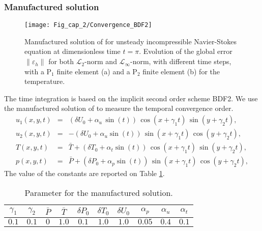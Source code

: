 \subsubsection{Manufactured solution} \label{subsub-conv-nourg}
\begin{figure}
	\begin{center}
		\texttt{[image: Fig\_cap\_2/Convergence\_BDF2]} 
	\end{center}
	\caption{Manufactured solution of \cite{nourgaliev2016fully} for unsteady incompressible Navier-Stokes equation at dimensionless time $t = \pi$. Evolution of the global error $\| \varepsilon_h \|$ for both $\mathcal{L}_2$-norm and $\mathcal{L}_\infty$-norm, with different time steps, with a P$_1$ finite element (a) and a P$_2$ finite element (b) for the temperature.}
	\label{fig-conv-bdf2}
\end{figure}

The time integration is based on the implicit second order scheme BDF2.
We use the manufactured solution of \cite{nourgaliev2016fully} to measure the temporal convergence order.
\begin{eqnarray}
	u_1(x,y,t) &=& \left( \delta U_0 + \alpha_u \, \sin(t) \right) \, \cos(x+ \gamma_1 t) \, \sin(y+ \gamma_2 t), \\ \nonumber
	u_2(x,y,t) &=& - \left( \delta U_0 + \alpha_u \sin(t) \right) \, \sin(x+ \gamma_1 t) \, \cos(y+ \gamma_2 t), \\ \nonumber
	T(x,y,t) &=& \bar{T} + \left( \delta T_0 + \alpha_t \sin(t) \right) \, \cos(x+ \gamma_1 t) \, \sin(y+ \gamma_2 t), \\ \nonumber
	p(x,y,t) &=& \bar{P} + \left(\delta P_0 + \alpha_p \sin(t) \right) \, \sin(x+ \gamma_1 t) \, \cos(y+ \gamma_2 t), 
\end{eqnarray}
The value of the constants are reported on Table \ref{tab-constant}.
\begin{table}[!h]
\centering
\begin{tabular}{*{10}{c}}
  $\gamma_1$ & $\gamma_2$ & $\bar{P}$ & $\bar{T}$ & $\delta P_0$ & $\delta T_0$ & $\delta U_0$ & $\alpha_p$ & $\alpha_u$ & $\alpha_t$\\
   \midrule
  $0.1$ & $0.1$ & $0$ & $1.0$ &  $0.1$ & $1.0$ & $1.0$ & $0.05$ & $0.4$ & $0.1$ \\

 \end{tabular}
\caption{Parameter for the manufactured solution.}
\label{tab-constant}
\end{table}

